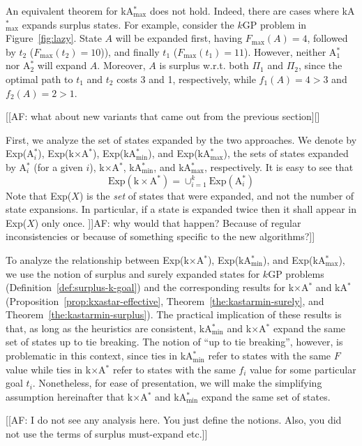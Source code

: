 \documentclass[twoside,11pt]{article}
\newcommand{\kgs}{$k$GP\xspace}
\newcommand{\kastar}{kA$^*$\xspace}
\newcommand{\kastarvar}[1]{\textup{kA}$^*_{#1}$\xspace}
\newcommand{\kastarmin}{\kastarvar{\min}}
\newcommand{\kastarmax}{\kastarvar{\max}}
\newcommand{\kxastar}{k$\times$A$^*$\xspace}
\newcommand{\astari}[1]{A$^*_{#1}$\xspace}
\begin{document}
An equivalent theorem for \kastarmax does not hold.
Indeed, there are cases where \kastarmax expands surplus states.
For example, consider the \kgs problem in Figure~\ref{fig:lazy}.
State $A$ will be expanded first, having $F_{\max}(A) = 4$, followed by $t_2$ ($F_{\max}(t_2) = 10$)), and finally $t_1$ ($F_{\max}(t_1) = 11$).
However, neither \astari{1} nor \astari{2} will expand $A$.
Moreover, $A$ is surplus w.r.t. both $\Pi_1$ and $\Pi_2$, since the optimal path to $t_1$ and $t_2$ costs 3 and 1, respectively, while $f_1(A) = 4 > 3$ and $f_2(A) = 2 > 1$.



[[AF: what about new variants that came out from the previous section][]

First, we analyze the set of states expanded by the two approaches.
We denote by Exp(\astari{i}), Exp(\kxastar), Exp(\kastarmin), and Exp(\kastarmax), the sets of states expanded by \astari{i} (for a given $i$), \kxastar, \kastarmin, and \kastarmax, respectively.
It is easy to see that
\begin{equation}
  \text{Exp}(\text{\kxastar})=\cup_{i=1}^k \text{Exp}(\text{\astari{i}})
\end{equation}
Note that Exp($X$) is the \emph{set} of states that were expanded, and not the number of state expansions.
In particular, if a state is expanded twice then it shall appear in Exp($X$) only once. ]]AF: why would that happen? Because of regular inconsistencies or because of something specific to the new algorithms?]]

To analyze the relationship between Exp(\kxastar), Exp(\kastarmin), and Exp(\kastarmax), we use the notion of surplus and surely expanded states for \kgs problems (Definition~\ref{def:surplus-k-goal}) and the corresponding results for \kxastar and \kastar (Proposition~\ref{prop:kxastar-effective}, Theorem~\ref{the:kastarmin-surely}, and Theorem~\ref{the:kastarmin-surplus}).
The practical implication of these results is that, as long as the heuristics are consistent, \kastarmin and \kxastar expand the same set of states up to tie breaking.
The notion of ``up to tie breaking'', however, is problematic in this context, since ties in \kastarmin refer to states with the same $F$ value while ties in \kxastar refer to states with the same $f_i$ value for some particular goal $t_i$.
Nonetheless, for ease of presentation, we will make the simplifying assumption hereinafter that \kxastar and \kastarmin expand the same set of states.


[[AF: I do not see any analysis here. You just define the notions. Also, you did not use the terms of surplus must-expand etc.]]
\end{document}
